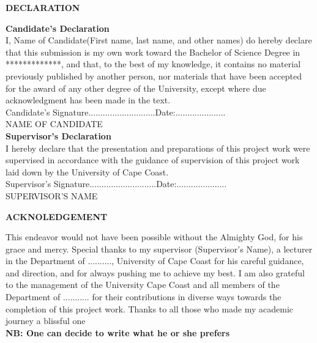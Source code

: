 \documentclass[12pt,a4paper]{report}
\begin{document}
\begin{center}


\begin{center}
\textbf{DECLARATION}\\
\end{center}
\end{center}
\raggedright\textbf{Candidate's Declaration}\\
\vspace{0.2cm}
I, Name of Candidate(First name, last name, and other names) do hereby declare that this submission is my own work toward the Bachelor of Science Degree in *************, and that, to the best of my knowledge, it contains no material previously published by another person, nor materials that have been accepted for the award of any other degree of the University, except where due acknowledgment has been made in the text.\\
\vspace{0.7cm}
Candidate's Signature............................\hfill Date:.....................\\
\vspace{0.3cm}
NAME OF CANDIDATE\\
\vspace{3.0cm}
\textbf{Supervisor's Declaration}\\
\vspace{0.2cm}
I hereby declare that the presentation and preparations of this project work were supervised in accordance with the guidance of supervision of this project work laid down by the University of Cape Coast.\\
\vspace{0.7cm}
Supervisor's Signature............................\hfill Date:.....................\\
\vspace{0.3cm}
SUPERVISOR'S NAME\\


\newpage


\begin{center}
 \textbf{ACKNOLEDGEMENT}\\
\end{center}
This endeavor would not have been
possible without the Almighty God, for his grace and mercy.
Special thanks to my supervisor (Supervisor's Name), a lecturer in the Department of ..........,
University of Cape Coast for his careful guidance, and direction, and for always pushing me to achieve my best. I am also grateful to the management of the University Cape Coast and all members of the Department of ........... for their contributions in diverse ways towards the completion of this project work. 
Thanks to all those who made my academic journey a blissful one\\
\textbf{NB: One can decide to write what he or she prefers}\\
\end{document}
